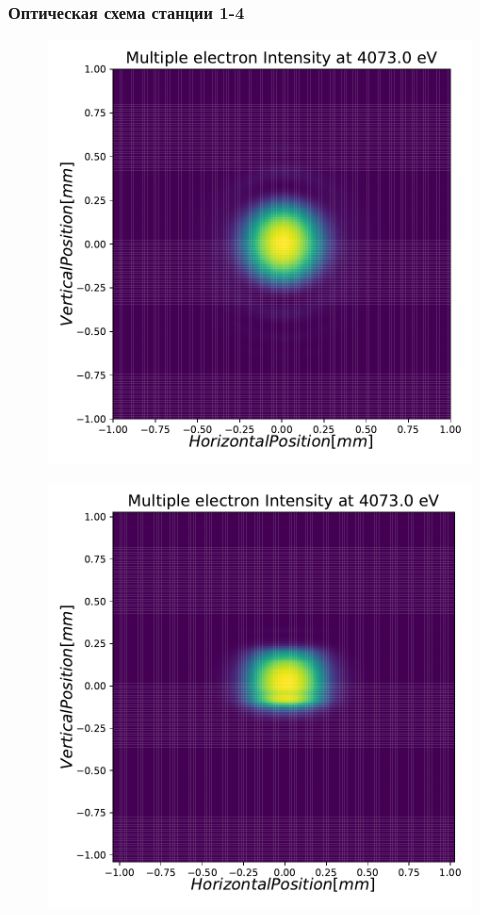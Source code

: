 \documentclass[14pt, hyperref = {colorlinks}]{beamer}
\begin{document}
\small
\begin{frame}
\frametitle{Оптическая схема станции 1-4}\label{t1}
\vspace{-10pt}
\begin{figure}[h]
	\vspace{15pt}	

	\begin{minipage}[h]{0.32\linewidth}
		\raggedright{\includegraphics[width=0.79\linewidth]{pic/3_harm_before_optics_2d.pdf}}
	\end{minipage}
	\begin{minipage}[h]{0.32\linewidth}
		\raggedright{\includegraphics[width=0.79\linewidth]{pic/3_harm_after_DCM_2d.pdf}}

\end{minipage}
\end{figure}
\end{frame}
\end{document}
